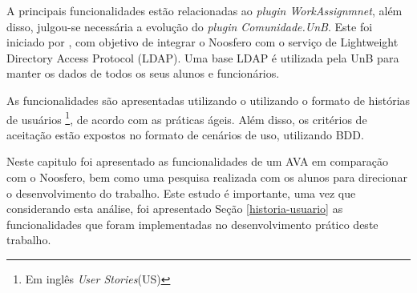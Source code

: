 A principais funcionalidades estão relacionadas ao \textit{plugin WorkAssignmnet}, além disso, julgou-se necessária a evolução do \textit{plugin Comunidade.UnB}. Este foi iniciado por , com objetivo de integrar o Noosfero com o serviço de Lightweight Directory Access Protocol (LDAP). Uma base LDAP é utilizada pela UnB para manter os dados de todos os seus alunos e funcionários.

As funcionalidades são apresentadas utilizando o utilizando o formato de histórias de usuários \footnote{Em inglês \textit{User Stories}(US)}, de acordo com as práticas ágeis. Além disso, os critérios de aceitação estão expostos no formato de cenários de uso, utilizando BDD.



Neste capitulo foi apresentado as funcionalidades de um AVA em comparação com o Noosfero, bem como uma pesquisa realizada com os alunos para direcionar o desenvolvimento do trabalho. Este estudo é importante, uma vez que considerando esta análise, foi apresentado Seção \ref{historia-usuario} as funcionalidades que foram implementadas no desenvolvimento prático deste trabalho.
